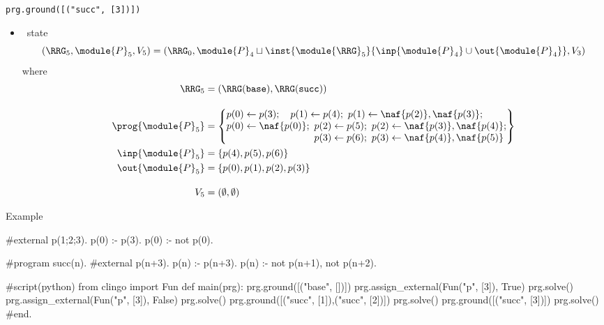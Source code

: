 \begin{frame}{\texttt{prg.ground([("succ", [3])])}}
  \begin{itemize}
  \item {} \clingo\ state
    \[
    (\boldsymbol{\RRG}_5,\module{P}_5,V_5 )
    =
    (\boldsymbol{\RRG}_0,\module{P}_4\sqcup\inst{\module{\RRG}_5}{\inp{\module{P}_4}\cup\out{\module{P}_4}},V_3)
    \]
    where
    \begin{align*}
      \boldsymbol{\RRG}_5 & {} = (\RRG(\mathtt{base}),\RRG(\mathtt{succ}))
      \\[10pt]
      \prog{\module{P}_5}
      & {} =
      \left\{
        \begin{array}{@{}l@{}}
          p(0)\leftarrow p(3);\quad   p(1)\leftarrow p(4);\ p(1)\leftarrow \naf{p(2)},\naf{p(3)};
          \\
          p(0)\leftarrow \naf{p(0)};\ p(2)\leftarrow p(5);\ p(2)\leftarrow \naf{p(3)},\naf{p(4)};
          \\
          \phantom{p(0)\leftarrow \naf{p(0)};\ }\,p(3)\leftarrow p(6);\ p(3)\leftarrow \naf{p(4)},\naf{p(5)}
        \end{array}
      \right\}
      \\
      \inp{\module{P}_5}
      & {} =
      \left\{
        p(4),
        p(5),
        p(6)
      \right\}
      \\
      \out{\module{P}_5}
      & {} =
      \left\{
        p(0),p(1),p(2), p(3)
      \right\}
      \\[10pt]
      V_5 & {} = (\emptyset,\emptyset)
    \end{align*}
  \end{itemize}
\end{frame}
\begin{frame}[fragile]{Example}
\scriptsize\vspace{-10pt}%
\begin{semiverbatim}
   #external p(1;2;3).
   p(0) :- p(3).
   p(0) :- not p(0).

   #program succ(n).
   #external p(n+3).
   p(n) :- p(n+3).
   p(n) :- not p(n+1), not p(n+2).

   #script(python)
   from clingo import Fun
   def main(prg):
       prg.ground([("base", [])])
       prg.assign_external(Fun("p", [3]), True)
       prg.solve()
       prg.assign_external(Fun("p", [3]), False)
       prg.solve()
       prg.ground([("succ", [1]),("succ", [2])])
       prg.solve()
     \alert<1>{prg.ground([("succ", [3])])}
     \alert<2>{prg.solve()}
   #end.
\end{semiverbatim}
\end{frame}
